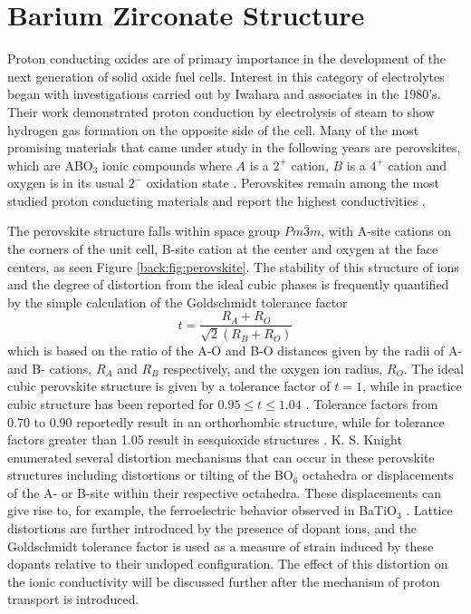 \section{Barium Zirconate Structure}

Proton conducting oxides are of primary importance in the development of the next generation of solid oxide fuel cells. Interest in this category of electrolytes began with investigations carried out by Iwahara and associates \cite{Iwahara1981,Iwahara1988} in the 1980's. Their work demonstrated proton conduction by electrolysis of steam to show hydrogen gas formation on the opposite side of the cell. Many of the most promising materials that came under study in the following years are perovskites, which are ABO$_3$ ionic compounds where $A$ is a $2^+$ cation, $B$ is a $4^+$ cation and oxygen is in its usual $2^-$ oxidation state \cite{Uchida1983}. Perovskites remain among the most studied proton conducting materials and report the highest conductivities \cite{Kreuer2003}.

The perovskite structure falls within space group $Pm\bar{3}m$, with A-site cations on the corners of the unit cell, B-site cation at the center and oxygen at the face centers, as seen Figure \ref{back:fig:perovskite}. The stability of this structure of ions and the degree of distortion from the ideal cubic phases is frequently quantified by the simple calculation of the Goldschmidt tolerance factor 
\begin{equation}
    t = \frac{R_A + R_O}{\sqrt{2}(R_B + R_O)}
    \label{back:equ:goldschmidt}
\end{equation}
which is based on the ratio of the A-O and B-O distances given by the radii of A- and B- cations, $R_A$ and $R_B$ respectively, and the oxygen ion radius, $R_O$. The ideal cubic perovskite structure is given by a tolerance factor of $t=1$, while in practice cubic structure has been reported for $0.95 \leq t \leq 1.04$ \cite{SAMMELLS1992}. Tolerance factors from 0.70 to 0.90 reportedly result in an orthorhombic structure, while for tolerance factors greater than 1.05 result in sesquioxide structures \cite{Giaquinta1994}. K. S. Knight enumerated several distortion mechanisms that can occur in these perovskite structures including distortions or tilting of the BO$_6$ octahedra or displacements of the A- or B-site within their respective octahedra. These displacements can give rise to, for example, the ferroelectric behavior observed in BaTiO$_3$ \cite{Kwei1993}. Lattice distortions are further introduced by the presence of dopant ions, and the Goldschmidt tolerance factor is used as a measure of strain induced by these dopants relative to their undoped configuration. The effect of this distortion on the ionic conductivity will be discussed further after the mechanism of proton transport is introduced.


